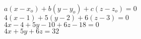 \documentclass[11pt]{article}
\begin{document}
\begin{enumerate}
 \\
$a(x-x_o)+b(y-y_o)+c(z-z_o)=0$
\\
$4(x-1)+5(y-2)+6(z-3)=0$
\\
$4x-4+5y-10+6z-18=0 $
\\
$4x+5y+6z=32 $







\end{enumerate}
\end{document}
